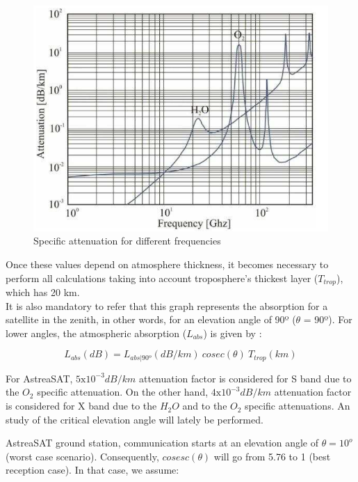 \begin{figure}[H]
	\includegraphics[scale=0.7]{./sections/SatelliteDept/sections/images/specificAttenuation}
	\centering
	\caption[Specific attenuation for different frequencies]{Specific attenuation for different frequencies \cite{Jorge2012}}
	\label{specificAtenuattion}
\end{figure}

Once these values depend on atmosphere thickness, it becomes necessary to perform all calculations taking into  account troposphere's thickest layer ($T_{trop}$), which has 20 km.\\ It is also mandatory to refer that this graph represents the absorption for a satellite in the zenith, in other  words, for an elevation angle of 90º ($\theta$ = 90º). For lower angles, the atmospheric absorption ($L_{abs}$) is  given by \cite{Jorge2012}:

\begin{equation}
	L_{abs}(dB)=L_{abs|90º} (dB/km)\ cosec(\theta)\ T_{trop}(km)
	\label{Labs}
\end{equation}

For AstreaSAT, $5\mathrm{x}10^{-3}dB/km$ attenuation factor is considered for S band due to the $O_2$ specific attenuation. On the other hand, $4\mathrm{x}10^{-3}dB/km$ attenuation factor is considered for X band due to the $H_2O$ and to the $O_2$ specific attenuations. An study of the critical elevation angle will lately be performed. 

\For AstreaSAT ground station, communication starts at an elevation angle of $\theta=10^o$ (worst case scenario). Consequently, $cosesc(\theta)$ will go from 5.76 to 1 (best reception case). In that case, we assume:

